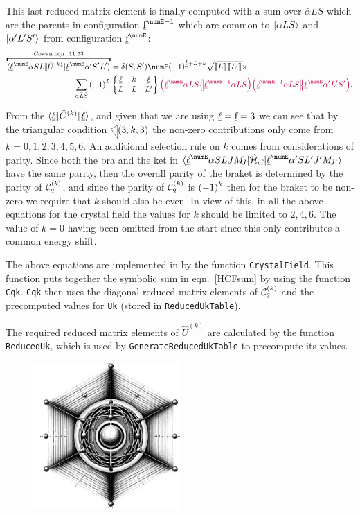 \documentclass{article}
\begin{document}
This last reduced matrix element is finally computed with a sum over $\bar{\alpha}\bar{L}\bar{S}$ which are the parents in configuration $\forb^{\numE-1}$ which are common to $|\alpha L S\rangle$ and $|\alpha' L' S'\rangle$ from configuration $\forb^{\numE}$:
\begin{align}
\overbracket{\redbraopket{\lorb^\numE \alpha S L} 
    {\op{U}^{(k)}}
    {\lorb^\numE \alpha' S' L'}}^{\text{Cowan eqn. 11.53}} &= \kronecker{S}{S'} \numE \phaser{\lorb + L + k}
         \sqrt{\tpobraket{L}\tpobraket{L'}} \times \\
\nonumber \sum_{\bar{\alpha}\bar{L}\bar{S}} 
    \phaser{\bar{L}} & \sixj{\lorb}{k}{\lorb}{L}{\bar{L}}{L'}
    \cfpinv{\lorb^\numE \alpha L S}
        {\lorb^{\numE - 1}\bar{\alpha}\bar{L}\bar{S}}
    \cfp{\lorb^{\numE -1}\bar{\alpha}\bar{L}\bar{S}}{\lorb^\numE\alpha'L'S'}.
\end{align}

From the $\langle \underbar{$\ell$}|\!|\hat{C}^{(k)}|\!|\underbar{$\ell$}\rangle$, and given that we are using $\underbar{$\ell$} = \underbar{$\text{f}$} = 3$ we can see that by the triangular condition $\tricondition{3,k,3}$ the non-zero contributions only come from $k=0,1,2,3,4,5,6$. An additional selection rule on $k$ comes from considerations of parity. Since both the bra and the ket in $\braopket{\lorb^\numE \alpha SLJ \Msub{J}}{\hamCrystalFieldSymbol}{\lorb^\numE \alpha'S L' J' \Msub{J'}}$ have the same parity, then the overall parity of the braket is determined by the parity of $\mathcal{C}^{(k)}_q$, and since the parity of $\mathcal{C}^{(k)}_q$ is ${(-1)}^{k}$ then for the braket to be non-zero we require that $k$ should also be even. In view of this, in all the above equations for the crystal field the values for $k$ should be limited to $2,4,6$. The value of $k=0$ having been omitted from the start since this only contributes a common energy shift.

The above equations are implemented in \qlanth by the function \texttt{CrystalField}. This function puts together the symbolic sum in eqn.~\eqref{HCFsum} by using the function \texttt{Cqk}. \texttt{Cqk} then uses the diagonal reduced matrix elements of $\mathcal{C}^{(k)}_q$ and the precomputed values for \texttt{Uk} (stored in \texttt{ReducedUkTable}).

The required reduced matrix elements of $\hat{U}^{(k)}$ are calculated by the function \texttt{ReducedUk}, which is used by \texttt{GenerateReducedUkTable} to precompute its values.

\begin{figure}[h]
\centering
\includegraphics[width=0.5\textwidth]{ion_in_lattice.jpg}
\end{figure}
\end{document}
